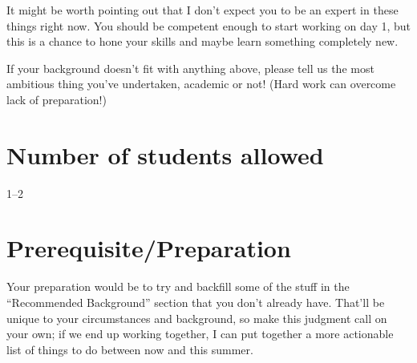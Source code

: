 \documentclass[12pt]{article}
\begin{document}
It might be worth pointing out that
I don't expect you to be an expert in these things right now.
You should be competent enough to start working on day 1, but
this is a chance to hone your skills and maybe learn something completely new.

If your background doesn't fit with anything above,
please tell us the most ambitious thing you've undertaken,
academic or not!
(Hard work can overcome lack of preparation!)

\section*{Number of students allowed}

1--2

\section*{Prerequisite/Preparation}

Your preparation would be to try and backfill some of
the stuff in the ``Recommended Background'' section
that you don't already have.
That'll be unique to your circumstances and background,
so make this judgment call on your own;
if we end up working together,
I can put together a more actionable list of things to do between now and this summer.




\end{document}

